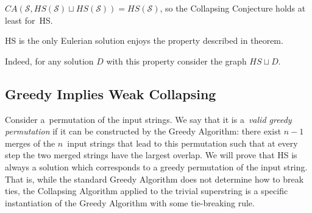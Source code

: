 \begin{corollary}
    $CA(\mathcal{S}, HS(\mathcal{S})\sqcup HS(\mathcal{S})) = HS(\mathcal{S})$, so the Collapsing Conjecture holds at least for~HS.
\end{corollary}
\begin{corollary}
    HS is the only Eulerian solution enjoys the property described in theorem.
\end{corollary}
Indeed, for any solution $D$ with this property consider the graph $HS \sqcup D$.

\subsection{Greedy Implies Weak Collapsing}
\label{sec:gr_im_wcc}
Consider a~permutation of the input strings. We say that it is a~{\em valid greedy permutation} if it can be constructed by the Greedy Algorithm: there exist $n-1$ merges of the $n$~input strings that lead to this permutation such that at every step the two merged strings have the largest overlap. We will prove that HS is always a solution which corresponds to a greedy permutation of the input string. That is, while the standard Greedy Algorithm does not determine how to break ties, the Collapsing Algorithm applied to the trivial superstring is a specific instantiation of the Greedy Algorithm with some tie-breaking rule.

